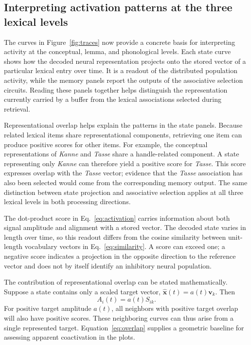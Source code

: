 \subsection{Interpreting activation patterns at the three lexical levels}
\label{sec:activation-interpretation}
The curves in Figure~\ref{fig:traces} now provide a concrete basis for interpreting activity at the conceptual, lemma, and phonological levels. Each state curve shows how the decoded neural representation projects onto the stored vector of a particular lexical entry over time. It is a readout of the distributed population activity, while the memory panels report the outputs of the associative selection circuits. Reading these panels together helps distinguish the representation currently carried by a buffer from the lexical associations selected during retrieval.

Representational overlap helps explain the patterns in the state panels. Because related lexical items share representational components, retrieving one item can produce positive scores for other items. For example, the conceptual representations of \emph{Kanne} and \emph{Tasse} share a handle-related component. A state representing only \emph{Kanne} can therefore yield a positive score for \emph{Tasse}. This score expresses overlap with the \emph{Tasse} vector; evidence that the \emph{Tasse} association has also been selected would come from the corresponding memory output. The same distinction between state projection and associative selection applies at all three lexical levels in both processing directions.

The dot-product score in Eq.~\eqref{eq:activation} carries information about both signal amplitude and alignment with a stored vector. The decoded state varies in length over time, so this readout differs from the cosine similarity between unit-length vocabulary vectors in Eq.~\eqref{eq:similarity}. A score can exceed one; a negative score indicates a projection in the opposite direction to the reference vector and does not by itself identify an inhibitory neural population.

The contribution of representational overlap can be stated mathematically. Suppose a state contains only a scaled target vector, $\hat{\mathbf x}(t)=a(t)\mathbf v_k$. Then
\begin{equation}
 A_i(t)=a(t)S_{ik}.
 \label{eq:overlap}
\end{equation}
For positive target amplitude $a(t)$, all neighbors with positive target overlap will also have positive scores. These neighboring curves can thus arise from a single represented target. Equation~\eqref{eq:overlap} supplies a geometric baseline for assessing apparent coactivation in the plots.

